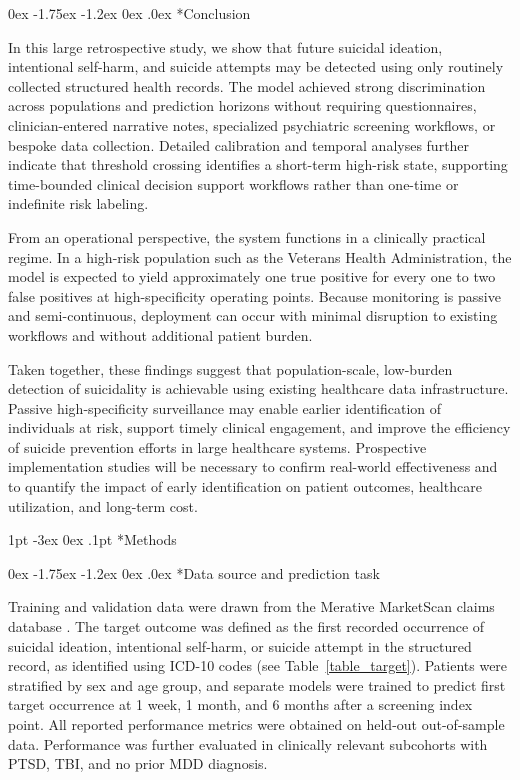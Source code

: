 \documentclass[onecolumn, compsoc,11pt]{IEEEtran}
\makeatletter
\renewcommand\section{\@startsection {section}{1}{\z@}
  {1pt \@plus -3ex \@minus 0ex}
  {.1pt}
  {\large\bfseries\scshape\color{black!70}}}
\renewcommand\subsection{\@startsection {subsection}{2}{\z@}
  {0ex \@plus -1.75ex \@minus -1.2ex}
  {0ex \@plus.0ex}
  {\fontsize{11}{11}\selectfont\bfseries\sffamily}}
\makeatother
\begin{document}
\subsection*{Conclusion}

In this large retrospective study, we show that future suicidal ideation, intentional self-harm, and suicide attempts may be detected using only routinely collected structured health records. The model achieved strong discrimination across populations and prediction horizons without requiring questionnaires, clinician-entered narrative notes, specialized psychiatric screening workflows, or bespoke data collection. Detailed calibration and temporal analyses further indicate that threshold crossing identifies a short-term high-risk state, supporting time-bounded clinical decision support workflows rather than one-time or indefinite risk labeling.

From an operational perspective, the system functions in a clinically practical regime. In a high-risk population such as the Veterans Health Administration, the model is expected to yield approximately one true positive for every one to two false positives at high-specificity operating points. Because monitoring is passive and semi-continuous, deployment can occur with minimal disruption to existing workflows and without additional patient burden.

Taken together, these findings suggest that population-scale, low-burden detection of suicidality is achievable using existing healthcare data infrastructure. Passive high-specificity surveillance may enable earlier identification of individuals at risk, support timely clinical engagement, and improve the efficiency of suicide prevention efforts in large healthcare systems. Prospective implementation studies will be necessary to confirm real-world effectiveness and to quantify the impact of early identification on patient outcomes, healthcare utilization, and long-term cost.



\section*{Methods}

\subsection*{Data source and prediction task}

Training and validation data were drawn from the Merative MarketScan claims database \cite{hansen2017truven}. The target outcome was defined as the first recorded occurrence of suicidal ideation, intentional self-harm, or suicide attempt in the structured record, as identified using ICD-10 codes (see Table~\ref{table_target}).
Patients were stratified by sex and age group, and separate models were trained to predict first target occurrence at 1 week, 1 month, and 6 months after a screening index point. All reported performance metrics were obtained on held-out out-of-sample data. Performance was further evaluated in clinically relevant subcohorts with PTSD, TBI, and no prior MDD diagnosis.
\end{document}
